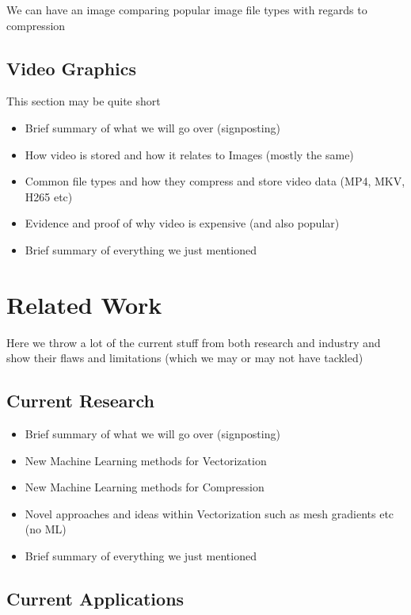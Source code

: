 \documentclass[12pt]{article}
\begin{document}
    We can have an image comparing popular image file types with regards to compression

    \subsection{Video Graphics}

    This section may be quite short

    \begin{itemize}
        \item Brief summary of what we will go over (signposting)
        \item How video is stored and how it relates to Images (mostly the same)
        \item Common file types and how they compress and store video data (MP4, MKV, H265 etc)
        \item Evidence and proof of why video is expensive (and also popular)
        \item Brief summary of everything we just mentioned
    \end{itemize}

    \pagebreak


    \section{Related Work}

    Here we throw a lot of the current stuff from both research and industry and show their flaws and limitations
    (which we may or may not have tackled)

    \subsection{Current Research}

    \begin{itemize}
        \item Brief summary of what we will go over (signposting)
        \item New Machine Learning methods for Vectorization
        \item New Machine Learning methods for Compression
        \item Novel approaches and ideas within Vectorization such as mesh gradients etc (no ML)
        \item Brief summary of everything we just mentioned
    \end{itemize}

    \subsection{Current Applications}
\end{document}
